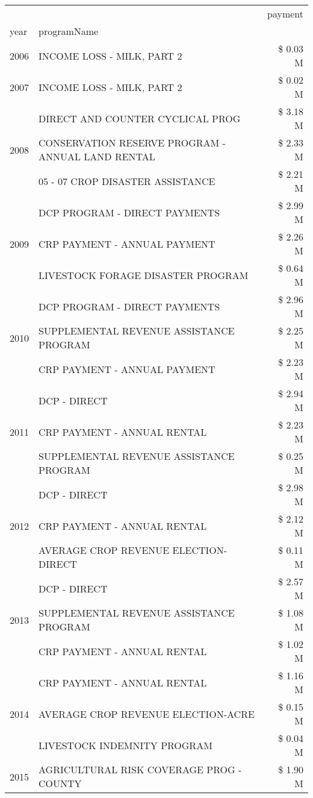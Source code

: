 \begin{tabular}{llr}
\toprule
 &  & payment \\
year & programName &  \\
\midrule
2006 & INCOME LOSS - MILK, PART 2 & \$ 0.03 M \\
\cline{1-3}
2007 & INCOME LOSS - MILK, PART 2 & \$ 0.02 M \\
\cline{1-3}
\multirow[t]{3}{*}{2008} & DIRECT AND COUNTER CYCLICAL PROG & \$ 3.18 M \\
 & CONSERVATION RESERVE PROGRAM - ANNUAL LAND RENTAL & \$ 2.33 M \\
 & 05 - 07 CROP DISASTER ASSISTANCE & \$ 2.21 M \\
\cline{1-3}
\multirow[t]{3}{*}{2009} & DCP PROGRAM - DIRECT PAYMENTS & \$ 2.99 M \\
 & CRP PAYMENT - ANNUAL PAYMENT & \$ 2.26 M \\
 & LIVESTOCK FORAGE DISASTER  PROGRAM & \$ 0.64 M \\
\cline{1-3}
\multirow[t]{3}{*}{2010} & DCP PROGRAM - DIRECT PAYMENTS & \$ 2.96 M \\
 & SUPPLEMENTAL REVENUE ASSISTANCE PROGRAM & \$ 2.25 M \\
 & CRP PAYMENT - ANNUAL PAYMENT & \$ 2.23 M \\
\cline{1-3}
\multirow[t]{3}{*}{2011} & DCP - DIRECT & \$ 2.94 M \\
 & CRP PAYMENT - ANNUAL RENTAL & \$ 2.23 M \\
 & SUPPLEMENTAL REVENUE ASSISTANCE PROGRAM & \$ 0.25 M \\
\cline{1-3}
\multirow[t]{3}{*}{2012} & DCP - DIRECT & \$ 2.98 M \\
 & CRP PAYMENT - ANNUAL RENTAL & \$ 2.12 M \\
 & AVERAGE CROP REVENUE ELECTION-DIRECT & \$ 0.11 M \\
\cline{1-3}
\multirow[t]{3}{*}{2013} & DCP - DIRECT & \$ 2.57 M \\
 & SUPPLEMENTAL REVENUE ASSISTANCE PROGRAM & \$ 1.08 M \\
 & CRP PAYMENT - ANNUAL RENTAL & \$ 1.02 M \\
\cline{1-3}
\multirow[t]{3}{*}{2014} & CRP PAYMENT - ANNUAL RENTAL & \$ 1.16 M \\
 & AVERAGE CROP REVENUE ELECTION-ACRE & \$ 0.15 M \\
 & LIVESTOCK INDEMNITY PROGRAM & \$ 0.04 M \\
\cline{1-3}
\multirow[t]{3}{*}{2015} & AGRICULTURAL RISK COVERAGE PROG - COUNTY & \$ 1.90 M \\

\end{tabular}
